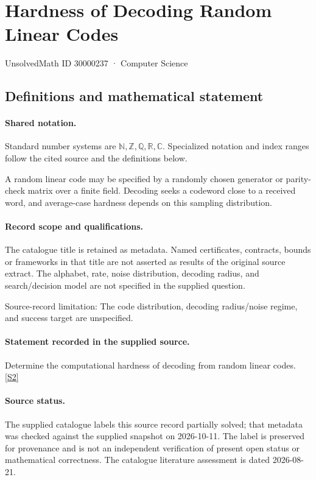 \documentclass[11pt]{article}
\newcommand{\sref}[2]{\hyperlink{source:#1:#2}{[S#2]}}
\begin{document}
\setcounter{section}{30000236}
\section{Hardness of Decoding Random Linear Codes}\label{30000237}
{\small\sffamily UnsolvedMath ID 30000237 · Computer Science}
\subsection{Definitions and mathematical statement}

\paragraph{Shared notation.}Standard number systems are $\mathbb N,\mathbb Z,\mathbb Q,\mathbb R,\mathbb C$. Specialized notation and index ranges follow the cited source and the definitions below.


A random linear code may be specified by a randomly chosen generator or parity-check matrix over a finite field. Decoding seeks a codeword close to a received word, and average-case hardness depends on this sampling distribution.
\paragraph{Record scope and qualifications.}
The catalogue title is retained as metadata. Named certificates, contracts, bounds or frameworks in that title are not asserted as results of the original source extract.
The alphabet, rate, noise distribution, decoding radius, and search/decision model are not specified in the supplied question.

Source-record limitation: The code distribution, decoding radius/noise regime, and success target are unspecified.
\paragraph{Statement recorded in the supplied source.}
Determine the computational hardness of decoding from random linear codes. \sref{30000237}{2}
\paragraph{Source status.}
The supplied catalogue labels this source record partially solved; that metadata was checked against the supplied snapshot on 2026-10-11. The label is preserved for provenance and is not an independent verification of present open status or mathematical correctness. The catalogue literature assessment is dated 2026-08-21.
\end{document}
